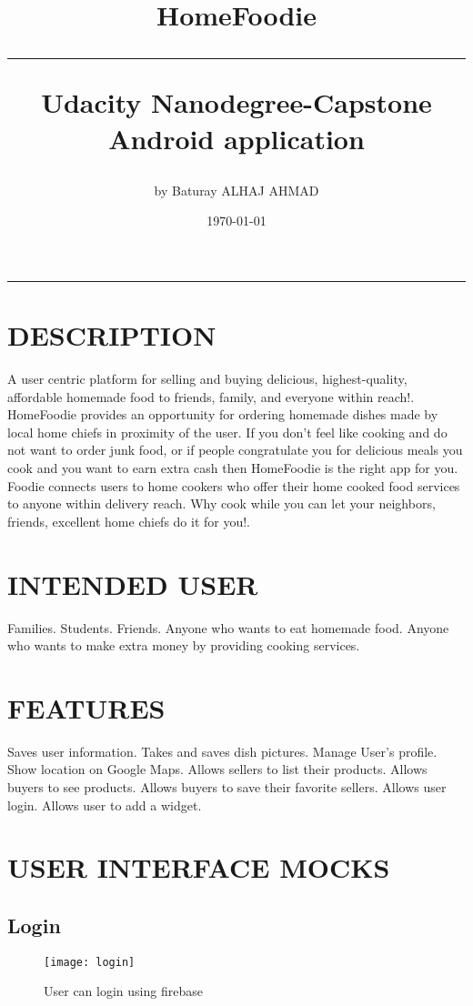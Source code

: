 \documentclass{article}
\title{%
  \huge \bfseries{HomeFoodie}\\
  \rule{8cm}{0.2pt}
  \linebreak[10pt]
  \large Udacity Nanodegree-Capstone \\
  \large Android application\\}
\date{\today}
\author{by Baturay ALHAJ AHMAD}
\begin{document}
  \maketitle
  \hrule

  \pagebreak


\tableofcontents
\pagebreak
\section{DESCRIPTION}
  A user centric platform for selling and buying delicious, highest-quality, affordable homemade food to friends, family, and everyone within reach!.
  HomeFoodie provides an opportunity for ordering homemade dishes made by local home chiefs in proximity of the user.
  If you don’t feel like cooking and do not want to order junk food, or if people congratulate you for delicious meals you cook and you want to earn extra cash then HomeFoodie is the right app for you. Foodie connects users to home cookers who offer their home cooked food services to anyone within delivery reach.
  Why cook while you can let your neighbors, friends, excellent home chiefs do it for you!.

\section{INTENDED USER}
  Families.
  Students.
  Friends.
  Anyone who wants to eat homemade food.
  Anyone who wants to make extra money by providing cooking services.


\section{FEATURES}
  Saves user information. 
  Takes and saves dish pictures.
  Manage User’s profile.
  Show location on Google Maps.
  Allows sellers to list their products.
  Allows buyers to see products.
  Allows buyers to save their favorite sellers.
  Allows user login.
  Allows user to add a widget.


\section{USER INTERFACE MOCKS}
\subsection{Login}
\begin{figure}[!ht]
    \centering
    \texttt{[image: login]}
    \caption{User can login using firebase}
    \label{fig:login}
  \end{figure}
\end{document}
